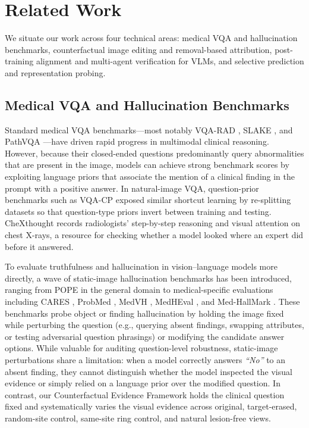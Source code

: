 \documentclass[5p,times,twocolumn,authoryear]{elsarticle}
\begin{document}
\section{Related Work}
\label{sec:related_work}
We situate our work across four technical areas: medical VQA and hallucination benchmarks, counterfactual image editing and removal-based attribution, post-training alignment and multi-agent verification for VLMs, and selective prediction and representation probing.

\subsection{Medical VQA and Hallucination Benchmarks}
\label{subsec:rw_benchmarks}
Standard medical VQA benchmarks---most notably VQA-RAD \citep{lau2018vqarad}, SLAKE \citep{liu2021slake}, and PathVQA \citep{he2020pathvqa}---have driven rapid progress in multimodal clinical reasoning. However, because their closed-ended questions predominantly query abnormalities that are present in the image, models can achieve strong benchmark scores by exploiting language priors that associate the mention of a clinical finding in the prompt with a positive answer. In natural-image VQA, question-prior benchmarks such as VQA-CP \citep{agrawal2018vqacp} exposed similar shortcut learning by re-splitting datasets so that question-type priors invert between training and testing. CheXthought \citep{sharma2026chexthought} records radiologists' step-by-step reasoning and visual attention on chest X-rays, a resource for checking whether a model looked where an expert did before it answered.

To evaluate truthfulness and hallucination in vision--language models more directly, a wave of static-image hallucination benchmarks has been introduced, ranging from POPE \citep{li2023pope} in the general domain to medical-specific evaluations including CARES \citep{xia2024cares}, ProbMed \citep{yan2024probmed}, MedVH \citep{gu2024medvh}, MedHEval \citep{chang2024medheval}, and Med-HallMark \citep{chen2024medhallmark}. These benchmarks probe object or finding hallucination by holding the image fixed while perturbing the question (e.g., querying absent findings, swapping attributes, or testing adversarial question phrasings) or modifying the candidate answer options. While valuable for auditing question-level robustness, static-image perturbations share a limitation: when a model correctly answers \emph{``No''} to an absent finding, they cannot distinguish whether the model inspected the visual evidence or simply relied on a language prior over the modified question. In contrast, our Counterfactual Evidence Framework holds the clinical question fixed and systematically varies the visual evidence across original, target-erased, random-site control, same-site ring control, and natural lesion-free views.
\end{document}

